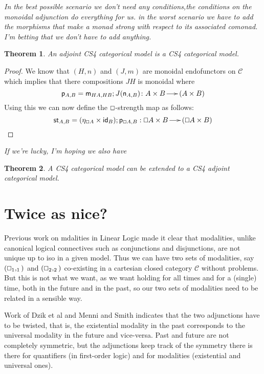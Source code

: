 \documentclass{article}
\let\Diamond\relax
\renewcommand{\Box}{\oblong}
\newcommand{\cat}[1]{\mathcal{#1}}
\newcommand{\pd}[0]{\times}
\newcommand{\st}[2]{\mathsf{st}_{#1,#2}}
\newcommand{\id}[0]{\mathsf{id}}
\newcommand{\m}[1]{\mathsf{m}_{#1}}
\newtheorem{theorem}{Theorem}
\begin{document}
\textit{In the best possible scenario we don't need any conditions,the conditions on the monoidal adjunction do everything for us. in the worst scenario we have to add the morphisms that make a monad strong with respect to its associated comonad. I'm betting that we don't have to add anything.}

\begin{theorem} An adjoint CS4 categorical model is a CS4 categorical model. \end{theorem}
\begin{proof}
  We know that $(H,n)$ and $(J,m)$ are monoidal endofunctors on
  $\cat{C}$ which implies that there compositions $JH$ is monoidal
  where
  \[
  \mathsf{p}_{A,B} = \m{HA,HB};J(\mathsf{n}_{A,B})
  \colon \Diamond A \pd \Diamond B \to \Diamond(A \pd B)
  \]
  Using this we can now define the $\Box$-strength map as follows:
  \[
  \st{A}{B} = (\eta_{\Box A} \pd \id_{\Diamond B});\mathsf{p}_{\Box A,B} : \Box A \pd \Diamond B \to \Diamond(\Box A \pd B)
  \]
\end{proof}

\textit{If we're lucky, I'm hoping we also have}

\begin{theorem} A CS4 categorical model can be extended to a CS4 adjoint categorical model.
\end{theorem}


\section{Twice as nice?}
Previous work on mdalities in Linear Logic made it clear that modalities, unlike canonical logical connectives such as conjunctions and disjunctions, are not unique up to iso in a given model. Thus we can have two sets of modalities, say $(\Box_1, \Diamond_1)$ and $(\Box_2, \Diamond_2)$ co-existing in a cartesian closed category $\cat{C}$ without problems. But this is not what we want, as we want holding for all times and for a (single) time, both in the future and in the past, so our two sets of modalities need to be related in  a sensible way.

Work of Dzik et al \cite{dziketal2012,dziketal2014} and Menni and Smith \cite{Menni:2014}  indicates that the two adjunctions have to be twisted, that is, the  existential modality in the past corresponds to the universal modality in the future and vice-versa. Past and future are not completely symmetric, but the adjunctions keep track of the symmetry there is there for quantifiers (in first-order logic) and for modalities (existential and universal ones).
\end{document}
